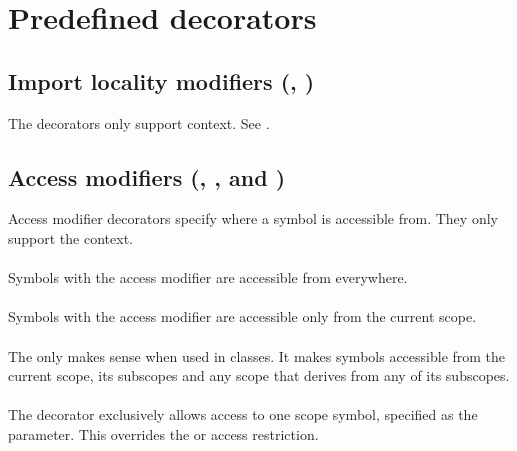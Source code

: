 \section{Predefined decorators}

\subsection{Import locality modifiers (, )}
The decorators only support  context. See .

\subsection{Access modifiers (, ,  and )} \label{accessModifierDecorators}
Access modifier decorators specify where a symbol is accessible from. They only support the  context.

\paragraph{} \label{decorator:public} Symbols with the  access modifier are accessible from everywhere.

\paragraph{} \label{decorator:private} Symbols with the  access modifier are accessible only from the current scope.

\paragraph{} \label{decorator:protected} The  only makes sense when used in classes. It makes symbols accessible from the current scope, its subscopes and any scope that derives from any of its subscopes.

\paragraph{} \label{decorator:friend} The  decorator exclusively allows access to one scope symbol, specified as the parameter. This overrides the  or  access restriction.


